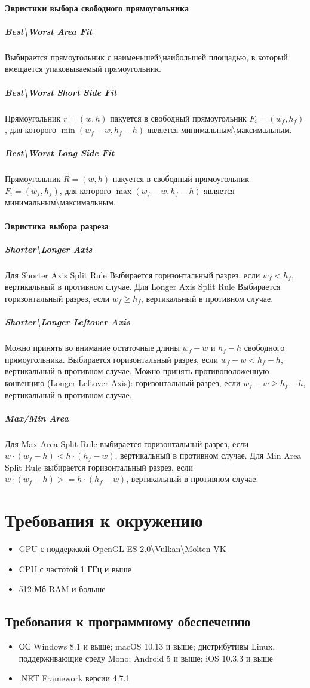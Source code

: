 \documentclass{fefu}
\begin{document}
\paragraph{Эвристики выбора свободного прямоугольника}
\subparagraph{Best\textbackslash Worst Area Fit}
Выбирается прямоугольник с наименьшей\textbackslash наибольшей площадью, в который вмещается упаковываемый прямоугольник.
\subparagraph{Best\textbackslash Worst Short Side Fit}
Прямоугольник $r = (w, h)$ пакуется в свободный прямоугольник $F_i = (w_f, h_f)$, для которого $\min (w_f - w, h_f - h)$
является минимальным\textbackslash максимальным.
\subparagraph{Best\textbackslash Worst Long Side Fit}
Прямоугольник $R = (w, h)$ пакуется в свободный прямоугольник $F_i = (w_f, h_f)$, для которого $\max (w_f - w, h_f - h)$
является минимальным\textbackslash максимальным.
\paragraph{Эвристика выбора разреза}
\subparagraph{Shorter\textbackslash Longer Axis}
Для Shorter Axis Split Rule Выбирается горизонтальный разрез, если $w_f < h_f$, вертикальный в противном случае.
Для Longer Axis Split Rule Выбирается горизонтальный разрез, если $w_f \geq h_f$, вертикальный в противном случае.
\subparagraph{Shorter\textbackslash Longer Leftover Axis}
Можно принять во внимание остаточные длины $w_f - w$ и $h_f - h$ свободного прямоугольника.
Выбирается горизонтальный разрез, если $w_f - w < h_f - h$, вертикальный в противном случае.
Можно принять противоположенную конвенцию (Longer Leftover Axis): горизонтальный разрез, если $w_f - w \geq h_f - h$,
вертикальный в противном случае.
\subparagraph{Max/Min Area}
Для Max Area Split Rule выбирается горизонтальный разрез, если $w \cdot (w_f - h) < h \cdot (h_f - w)$, вертикальный в
противном случае. Для Min Area Split Rule выбирается горизонтальный разрез, если $w \cdot (w_f - h) >= h \cdot (h_f - w)$, вертикальный в
противном случае.
\section{Требования к окружению}
\begin{itemize}
    \item GPU с поддержкой OpenGL ES 2.0\textbackslash Vulkan\textbackslash Molten VK
    \item CPU с частотой 1 ГГц и выше
    \item 512 Мб RAM и больше
\end{itemize}
\subsection{Требования к программному обеспечению}
\begin{itemize}
    \item ОС Windows 8.1 и выше; macOS 10.13 и выше; дистрибутивы
    Linux, поддерживающие среду Mono; Android 5 и выше; iOS 10.3.3 и выше
    \item .NET Framework версии 4.7.1
\end{itemize}
\end{document}
